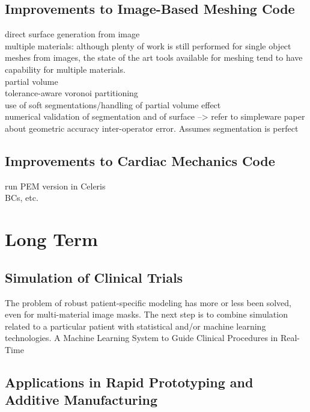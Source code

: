\subsection{Improvements to Image-Based Meshing Code}
\label{Improvements to Image-Based Meshing Code}
direct surface generation from image \\
multiple materials: although plenty of work is still performed for single object meshes from images, the state of the art tools available for meshing tend to have capability for multiple materials.  \\
partial volume \\
tolerance-aware voronoi partitioning \\
use of soft segmentations/handling of partial volume effect  \\
numerical validation of segmentation and of surface --> refer to simpleware paper about geometric accuracy
inter-operator error. Assumes segmentation is perfect

\subsection{Improvements to Cardiac Mechanics Code}
\label{Improvements to Cardiac Mechanics Code}
run PEM version in Celeris \\
BCs, etc.

\section{Long Term}
\label{Long Term}

\subsection{Simulation of Clinical Trials}
\label{Simulation of Clinical Trials}
The problem of robust patient-specific modeling has more or less been solved, even for multi-material image masks. The next step is to combine simulation related to a particular patient with statistical and/or machine learning technologies. 
A Machine Learning System to Guide Clinical Procedures in Real-Time

\subsection[Applications in Rapid Prototyping and Additive Manufacturing]{\texorpdfstring{Applications in Rapid Prototyping and Additive \newline Manufacturing}{Applications in Rapid Prototyping and Additive \newline Manufacturing}}
\label{Applications in Rapid Prototyping and Additive Manufacturing}


